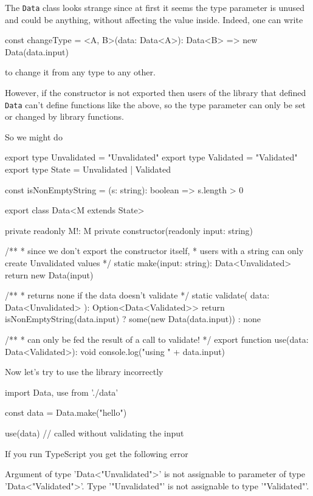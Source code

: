 \documentclass[12pt]{article}
\theoremstyle{definition}
\newenvironment{code}
  {\vspace{0.5cm} \VerbatimEnvironment\begin{typescriptcode}}
  {\end{typescriptcode} \vspace{0.2cm}}
\begin{document}
The \texttt{Data} class looks strange since at first it seems the type parameter is unused and could be anything,
without affecting the value inside. Indeed, one can write

\begin{code}
const changeType = <A, B>(data: Data<A>): Data<B> =>
  new Data(data.input)
\end{code}

to change it from any type to any other.

However, if the constructor is not exported then users of the library that defined \texttt{Data} can't define functions like the above,
so the type parameter can only be set or changed by library functions.

So we might do

\begin{code}
export type Unvalidated = "Unvalidated"
export type Validated = "Validated"
export type State = Unvalidated | Validated

const isNonEmptyString = (s: string): boolean => s.length > 0

export class Data<M extends State> {
  private readonly M!: M
  private constructor(readonly input: string) {}

  /**
   * since we don't export the constructor itself,
   * users with a string can only create Unvalidated values
   */
  static make(input: string): Data<Unvalidated> {
    return new Data(input)
  }

  /**
   * returns none if the data doesn't validate
   */
  static validate(
    data: Data<Unvalidated>
  ): Option<Data<Validated>> {
    return isNonEmptyString(data.input)
      ? some(new Data(data.input))
      : none
  }
}

/**
 * can only be fed the result of a call to validate!
 */
export function use(data: Data<Validated>): void {
  console.log("using " +  data.input)
}
\end{code}

Now let's try to use the library incorrectly

\begin{code}
import { Data, use } from './data'

const data = Data.make("hello")

use(data) // called without validating the input
\end{code}

If you run TypeScript you get the following error

\begin{code}
[ts]
Argument of type 'Data<"Unvalidated">' is not assignable
  to parameter of type 'Data<"Validated">'.
  Type '"Unvalidated"' is not assignable to type '"Validated"'.
\end{code}
\end{document}
